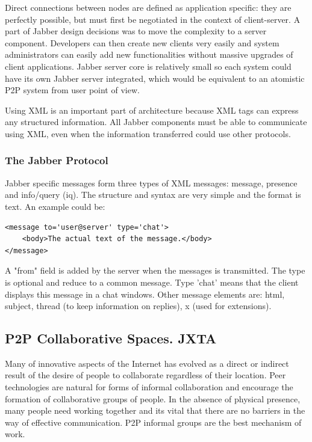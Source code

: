 Direct connections between nodes are defined as application specific: they are
perfectly possible, but must first be negotiated in the context of
client-server. A part of Jabber design decisions was to move the complexity to
a server component. Developers can then create new clients very easily and
system administrators can easily add new functionalities without massive
upgrades of client applications. Jabber server core is relatively small so each
system could have its own Jabber server integrated, which would be equivalent
to an atomistic P2P system from user point of view.

Using XML is an important part of architecture because XML tags can express any
structured information. All Jabber components must be able to communicate using
XML, even when the information transferred could use other protocols.

\subsubsection{The Jabber Protocol}

Jabber specific messages form three types of XML messages: message, presence
and info/query (iq). The structure and syntax are very simple and the format is
text. An example could be:

\begin{verbatim}
<message to='user@server' type='chat'>
    <body>The actual text of the message.</body>
</message>
\end{verbatim}

A "from" field is added by the server when the messages is transmitted. The
type is optional and reduce to a common message. Type 'chat' means that the
client displays this message in a chat windows. Other message elements are:
html, subject, thread (to keep information on replies), x (used for
extensions).

\subsection{P2P Collaborative Spaces. JXTA}

Many of innovative aspects of the Internet has evolved as a direct or indirect
result of the desire of people to collaborate regardless of their location.
Peer technologies are natural for forms of informal collaboration and encourage
the formation of collaborative groups of people. In the absence of physical
presence, many people need working together and its vital that there are no
barriers in the way of effective communication. P2P informal groups are the
best mechanism of work.

